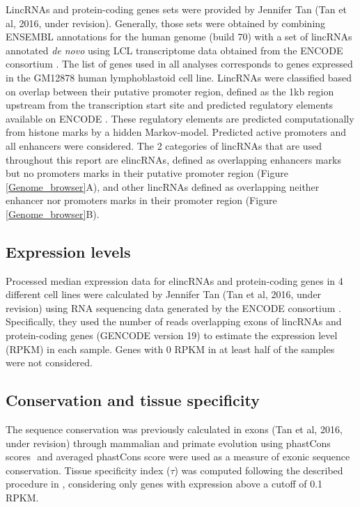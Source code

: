\documentclass[11pt,a4paper]{report}
\begin{document}
LincRNAs and protein-coding genes sets were provided by Jennifer Tan (Tan et al, 2016, under revision). Generally, those sets were obtained by combining ENSEMBL annotations for the human genome (build 70) with a set of lincRNAs annotated \textit{de novo} using LCL transcriptome data obtained from the ENCODE consortium \cite{ENCODEProject2012}. The list of genes used in all analyses corresponds to genes expressed in the GM12878 human lymphoblastoid cell line. LincRNAs were classified based on overlap between their putative promoter region, defined as the 1kb region upstream from the transcription start site and predicted regulatory elements available on ENCODE \cite{ENCODEProject2012}⁠. These regulatory elements are predicted computationally from histone marks by a hidden Markov-model. Predicted active promoters and all enhancers were considered. The 2 categories of lincRNAs that are used throughout this report are elincRNAs, defined as overlapping enhancers marks but no promoters marks in their putative promoter region (Figure \ref{Genome_browser}A), and other lincRNAs defined as overlapping neither enhancer nor promoters marks in their promoter region (Figure \ref{Genome_browser}B).

\subsection*{Expression levels}

Processed median expression data for elincRNAs and protein-coding genes in 4  different cell lines were calculated by Jennifer Tan (Tan et al, 2016, under revision) using RNA sequencing data generated by the ENCODE consortium \cite{ENCODEProject2012}. Specifically, they used the number of reads overlapping exons of lincRNAs and protein-coding genes (GENCODE version 19) to estimate the expression level (RPKM) in each sample. Genes with 0 RPKM in at least half  of the samples were not considered.

\subsection*{Conservation and tissue specificity}

The sequence conservation was previously calculated in exons (Tan et al, 2016, under revision) through mammalian and primate evolution using phastCons scores \cite{Siepel2005}⁠ and averaged phastCons score were used as a measure of exonic sequence conservation. Tissue specificity index ($\tau$) was computed following the described procedure in \cite{Kryuchkova2015a}, considering only genes with expression above a cutoff of 0.1 RPKM.
\end{document}

